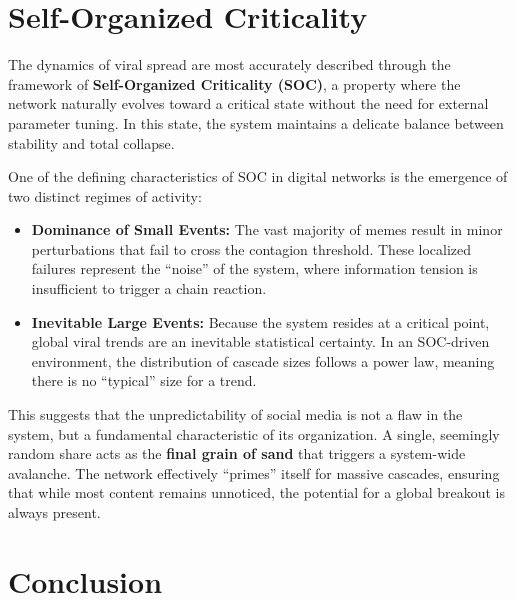 \documentclass[12pt]{article}
\begin{document}
\newpage

\section{\Large Self-Organized Criticality}


The dynamics of viral spread are most accurately described through the framework of \textbf{Self-Organized Criticality (SOC)}, a property where the network naturally evolves toward a critical state without the need for external parameter tuning. In this state, the system maintains a delicate balance between stability and total collapse. 

\vspace{0.6cm}

One of the defining characteristics of SOC in digital networks is the emergence of two distinct regimes of activity:
\begin{itemize}
    \item \textbf{Dominance of Small Events:} The vast majority of memes result in minor perturbations that fail to cross the contagion threshold. These localized failures represent the ``noise'' of the system, where information tension is insufficient to trigger a chain reaction.
    \item \textbf{Inevitable Large Events:} Because the system resides at a critical point, global viral trends are an inevitable statistical certainty. In an SOC-driven environment, the distribution of cascade sizes follows a power law, meaning there is no ``typical'' size for a trend.
\end{itemize}

\vspace{0.6cm}

This suggests that the unpredictability of social media is not a flaw in the system, but a fundamental characteristic of its organization. A single, seemingly random share acts as the \textbf{final grain of sand} that triggers a system-wide avalanche. The network effectively ``primes'' itself for massive cascades, ensuring that while most content remains unnoticed, the potential for a global breakout is always present.

\vfill %

\section{\Large Conclusion}
\end{document}
